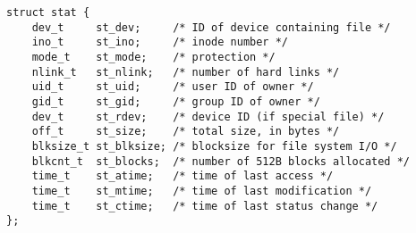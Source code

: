 
\begin{lstlisting}
struct stat {
	dev_t     st_dev;     /* ID of device containing file */
	ino_t     st_ino;     /* inode number */
	mode_t    st_mode;    /* protection */
	nlink_t   st_nlink;   /* number of hard links */
	uid_t     st_uid;     /* user ID of owner */
	gid_t     st_gid;     /* group ID of owner */
	dev_t     st_rdev;    /* device ID (if special file) */
	off_t     st_size;    /* total size, in bytes */
	blksize_t st_blksize; /* blocksize for file system I/O */
	blkcnt_t  st_blocks;  /* number of 512B blocks allocated */
	time_t    st_atime;   /* time of last access */
	time_t    st_mtime;   /* time of last modification */
	time_t    st_ctime;   /* time of last status change */
};
\end{lstlisting}
